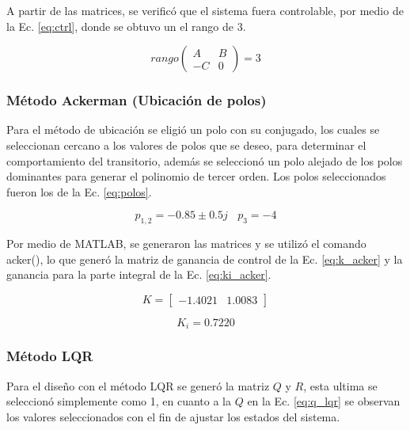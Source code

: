 \documentclass[conference,onecolumn,12pt]{IEEEtran}
\numberwithin{equation}{subsection}
\begin{document}
A partir de las matrices, se verificó que el sistema fuera controlable, por medio de la Ec. \ref{eq:ctrl}, donde se obtuvo un el rango de 3.

\begin{equation}
    rango \left( \begin{matrix}
        A & B \\
        -C & 0
    \end{matrix} \right) = 3
    \label{eq:ctrl}
\end{equation}

\subsubsection{Método Ackerman (Ubicación de polos)}

Para el método de ubicación se eligió un polo con su conjugado, los cuales se seleccionan cercano a los valores de polos que se deseo, para determinar el comportamiento del transitorio, además se seleccionó un polo alejado de los polos dominantes para generar el polinomio de tercer orden. Los polos seleccionados fueron los de la Ec. \ref{eq:polos}.

\begin{equation}
    p_{1,2} = -0.85 \pm 0.5j \ \ \ \ p_3 = -4
    \label{eq:polos}
\end{equation}

Por medio de MATLAB, se generaron las matrices y se utilizó el comando acker(), lo que generó la matriz de ganancia de control de la Ec. \ref{eq:k_acker} y la ganancia para la parte integral de la Ec. \ref{eq:ki_acker}.

\begin{equation}
   K = \begin{bmatrix}
       -1.4021 & 1.0083
   \end{bmatrix}
    \label{eq:k_acker}
\end{equation}

\begin{equation}
    K_i = 0.7220
    \label{eq:ki_acker}
\end{equation}

\subsubsection{Método LQR}

Para el diseño con el método LQR se generó la matriz $Q$ y $R$, esta ultima se seleccionó simplemente como 1, en cuanto a la $Q$ en la Ec. \ref{eq:q_lqr} se observan los valores seleccionados con el fin de ajustar los estados del sistema.
\end{document}
